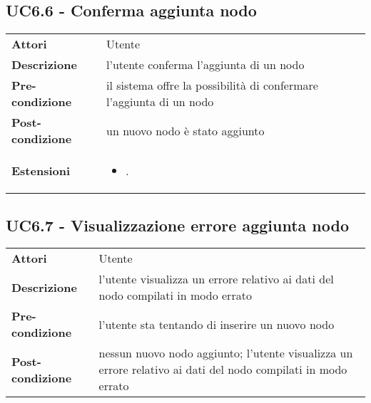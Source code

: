 \subsection{UC6.6 - Conferma aggiunta nodo}
\label{sssec:UC6.6}
\def\arraystretch{1.5}
\begin{tabularx}{\textwidth}{l|p{}}
\rowcolor{I} \multicolumn{2}{c}{\color{white}\textbf{UC6.6 - Conferma aggiunta nodo}} \\
\toprule
\endhead
\textbf{Attori} & Utente\\
\textbf{Descrizione} & l'utente conferma l'aggiunta di un nodo\\
\textbf{Pre-condizione} & il sistema offre la possibilità di confermare l'aggiunta di un nodo\\
\textbf{Post-condizione} & un nuovo nodo è stato aggiunto\\
\textbf{Estensioni} & \vspace{-1.2em}\begin{itemize}[leftmargin=*,noitemsep,nosep]
\item \nameref{sssec:UC6.7}.
\end{itemize}\\
\bottomrule
\end{tabularx}
\subsection{UC6.7 - Visualizzazione errore aggiunta nodo}
\label{sssec:UC6.7}
\def\arraystretch{1.5}
\begin{tabularx}{\textwidth}{l|p{}}
\rowcolor{I} \multicolumn{2}{c}{\color{white}\textbf{UC6.7 - Visualizzazione errore aggiunta nodo}} \\
\toprule
\endhead
\textbf{Attori} & Utente\\
\textbf{Descrizione} & l'utente visualizza un errore relativo ai dati del nodo compilati in modo errato\\
\textbf{Pre-condizione} & l'utente sta tentando di inserire un nuovo nodo\\
\textbf{Post-condizione} & nessun nuovo nodo aggiunto; l'utente visualizza un errore relativo ai dati del nodo compilati in modo errato\\
\bottomrule
\end{tabularx}

